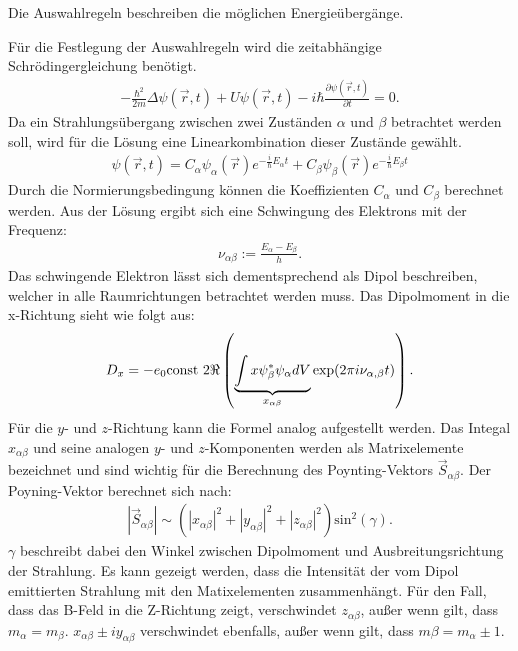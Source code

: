 Die Auswahlregeln beschreiben die möglichen Energieübergänge.

Für die Festlegung der Auswahlregeln wird die zeitabhängige Schrödingergleichung benötigt.
\begin{align}
	-\frac{\hbar^2}{2m}\Delta \psi(\vec{r},t)+U\psi(\vec{r},t)-i\hbar\frac{\partial \psi(\vec{r},t)}{\partial t}=0.
\end{align}
Da ein Strahlungsübergang zwischen zwei Zuständen $\alpha$ und $\beta$ betrachtet werden soll, wird für die Lösung eine Linearkombination dieser Zustände gewählt.%
\begin{align*}
  \psi(\vec{r},t)=C_{\alpha}\psi_{\alpha}(\vec{r})e^{-\frac{i}{\hbar}E_{\alpha}t}+C_{\beta}\psi_{\beta}(\vec{r})e^{-\frac{i}{\hbar}E_{\beta}t}
\end{align*}
Durch die Normierungsbedingung können die Koeffizienten $C_{\alpha}$ und $C_{\beta}$ berechnet werden.
Aus der Lösung ergibt sich eine Schwingung des Elektrons mit der Frequenz:
\begin{align*}
  \nu_{\alpha\beta}:=\frac{E_\alpha-E_\beta}{h}.
\end{align*}
Das schwingende Elektron lässt sich dementsprechend als Dipol beschreiben, welcher in alle Raumrichtungen betrachtet werden muss.
Das Dipolmoment in die x-Richtung sieht wie folgt aus:
\begin{align*}
  	D_x=-e_0\text{const } 2 \Re \real\left( \underbrace{\int x\psi^*_\beta\psi_\alpha dV}_{x_{\alpha\beta}}\exp(2\pi i\nu_{\alpha,\beta}t) \right).
\end{align*}
Für die $y$- und $z$-Richtung kann die Formel analog aufgestellt werden.
Das Integal $x_{\alpha\beta}$ und seine analogen $y$- und $z$-Komponenten werden als Matrixelemente bezeichnet und sind wichtig für die Berechnung des Poynting-Vektors $\vec{S}_{\alpha\beta}$.
Der Poyning-Vektor berechnet sich nach:
\begin{align*}
  |\vec{S}_{\alpha\beta}| \sim \left(|x_{\alpha\beta}|^2+|y_{\alpha\beta}|^2+|z_{\alpha\beta}|^2\right) \text{sin}^2(\gamma).
\end{align*}
$\gamma$ beschreibt dabei den Winkel zwischen Dipolmoment und Ausbreitungsrichtung der Strahlung.
Es kann gezeigt werden, dass die Intensität der vom Dipol emittierten Strahlung mit den Matixelementen zusammenhängt.
Für den Fall, dass das B-Feld in die Z-Richtung zeigt, verschwindet $z_{\alpha\beta}$, außer wenn gilt, dass $m_{\alpha} = m_{\beta}$.
$x_{\alpha\beta}\pm i y_{\alpha\beta}$ verschwindet ebenfalls, außer wenn gilt, dass $m{\beta} = m_{\alpha} \pm 1$.
